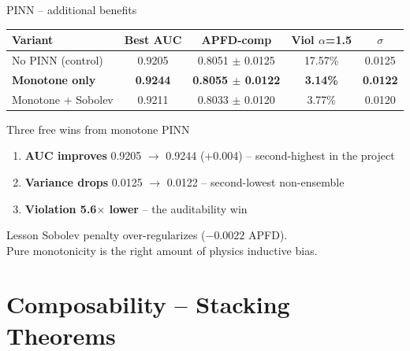 \documentclass[aspectratio=169,10pt]{beamer}
\begin{document}
\begin{frame}{PINN -- additional benefits}
\centering\scriptsize
\begin{tabular}{l c c c c}
  \toprule
  \textbf{Variant} & \textbf{Best AUC} & \textbf{APFD-comp} & \textbf{Viol $\alpha$=1.5} & \textbf{$\sigma$} \\
  \midrule
  No PINN (control) & 0.9205 & 0.8051 $\pm$ 0.0125 & 17.57\% & 0.0125 \\
  \rowcolor{success!15}
  \textbf{Monotone only} & \textbf{0.9244} & \textbf{0.8055 $\pm$ 0.0122} & \textbf{3.14\%} & \textbf{0.0122} \\
  Monotone + Sobolev & 0.9211 & 0.8033 $\pm$ 0.0120 & 3.77\% & 0.0120 \\
  \bottomrule
\end{tabular}

\vspace{0.7em}
\begin{block}{Three free wins from monotone PINN}
\footnotesize
\begin{enumerate}
  \item \textbf{AUC improves} 0.9205 $\to$ 0.9244 (+0.004) -- second-highest in the project
  \item \textbf{Variance drops} 0.0125 $\to$ 0.0122 -- second-lowest non-ensemble
  \item \textbf{Violation 5.6$\times$ lower} -- the auditability win
\end{enumerate}
\end{block}

\begin{exampleblock}{Lesson}
\footnotesize
Sobolev penalty over-regularizes ($-0.0022$ APFD).\\
Pure monotonicity is the right amount of physics inductive bias.
\end{exampleblock}
\end{frame}

\section{Composability -- Stacking Theorems}
\end{document}
